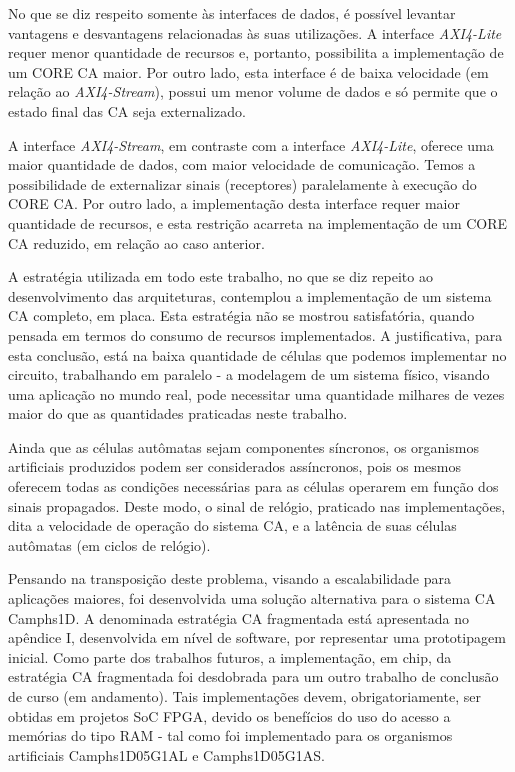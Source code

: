 No que se diz respeito somente às interfaces de dados, é possível levantar vantagens e desvantagens relacionadas às suas utilizações. A interface \textit{AXI4-Lite} requer menor quantidade de recursos e, portanto, possibilita a implementação de um CORE CA maior. Por outro lado, esta interface é de baixa velocidade (em relação ao \textit{AXI4-Stream}), possui um menor volume de dados e só permite que o estado final das CA seja externalizado.

A interface \textit{AXI4-Stream}, em contraste com a interface \textit{AXI4-Lite}, oferece uma maior quantidade de dados, com maior velocidade de comunicação. Temos a possibilidade de externalizar sinais (receptores) paralelamente à execução do CORE CA. Por outro lado, a implementação desta interface requer maior quantidade de recursos, e esta restrição acarreta na implementação de um CORE CA reduzido, em relação ao caso anterior.

A estratégia utilizada em todo este trabalho, no que se diz repeito ao desenvolvimento das arquiteturas, contemplou a implementação de um sistema CA completo, em placa. Esta estratégia não se mostrou satisfatória, quando pensada em termos do consumo de recursos implementados. A justificativa, para esta conclusão, está na baixa quantidade de células que podemos implementar no circuito, trabalhando em paralelo - a modelagem de um sistema físico, visando uma aplicação no mundo real, pode necessitar uma quantidade milhares de vezes maior do que as quantidades praticadas neste trabalho.

Ainda que as células autômatas sejam componentes síncronos, os organismos artificiais produzidos podem ser considerados assíncronos, pois os mesmos oferecem todas as condições necessárias para as células operarem em função dos sinais propagados. Deste modo, o sinal de relógio, praticado nas implementações, dita a velocidade de operação do sistema CA, e a latência de suas células autômatas (em ciclos de relógio).

Pensando na transposição deste problema, visando a escalabilidade para aplicações maiores, foi desenvolvida uma solução alternativa para o sistema CA Camphs1D. A denominada estratégia CA fragmentada está apresentada no apêndice I, desenvolvida em nível de software, por representar uma prototipagem inicial. Como parte dos trabalhos futuros, a implementação, em chip, da estratégia CA fragmentada foi desdobrada para um outro trabalho de conclusão de curso (em andamento). Tais implementações devem, obrigatoriamente, ser obtidas em projetos SoC FPGA, devido os benefícios do uso do acesso a memórias do tipo RAM - tal como foi implementado para os organismos artificiais Camphs1D05G1AL e Camphs1D05G1AS.   

